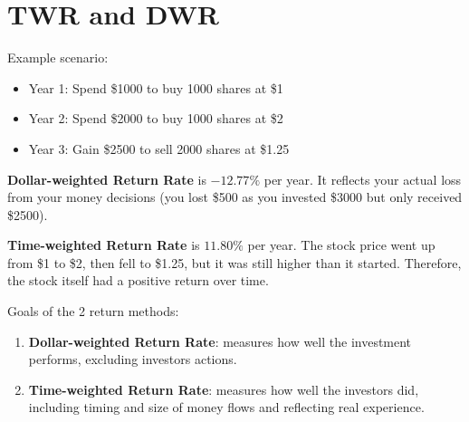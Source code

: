 \section{TWR and DWR}
\begin{comments}
    Example scenario: 
    \begin{itemize}
        \item Year 1: Spend \$1000 to buy 1000 shares at \$1
        \item Year 2: Spend \$2000 to buy 1000 shares at \$2
        \item Year 3: Gain \$2500 to sell 2000 shares at \$1.25
    \end{itemize}

    \textbf{Dollar-weighted Return Rate} is $-12.77\%$ per year. It reflects your 
    actual loss from your money decisions (you lost \$500 as you invested 
    \$3000 but only received \$2500). 

    \textbf{Time-weighted Return Rate} is $11.80\%$ per year. The stock price went up from \$1 to \$2, 
    then fell to \$1.25, but it was still higher than it started. Therefore, the stock
    itself had a positive return over time. 

\end{comments}

\begin{definition}
    Goals of the 2 return methods: 
    \begin{enumerate}
        \item \textbf{Dollar-weighted Return Rate}: measures how well the investment performs, excluding
    investors actions. 
        \item \textbf{Time-weighted Return Rate}: measures how well the investors did, 
    including timing and size of money flows and reflecting real experience. 
    \end{enumerate}

\end{definition}